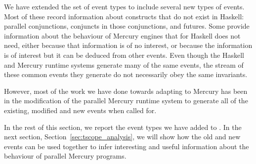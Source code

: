 
We have extended the set of \tscope event types
to include several new types of events.
Most of these record information about constructs that do not exist in Haskell:
parallel conjunctions, conjuncts in those conjunctions, and futures.
Some provide information about the behaviour of Mercury engines
that \tscope for Haskell does not need,
either because that information is of no interest,
or because the information is of interest
but it can be deduced from other events.
Even though the Haskell and Mercury runtime systems
generate many of the same events,
the stream of these common events they generate
do not necessarily obey the same invariants.

However, most of the work we have done towards adapting \tscope to Mercury
has been in the modification of the parallel Mercury runtime system
to generate all of the existing, modified and new events when called for.

In the rest of this section,
we report the event types we have added to \tscope.
In the next section, Section~\ref{sec:tscope_analysis},
we will show how the old and new events can be used together
to infer interesting and useful information
about the behaviour of parallel Mercury programs.


